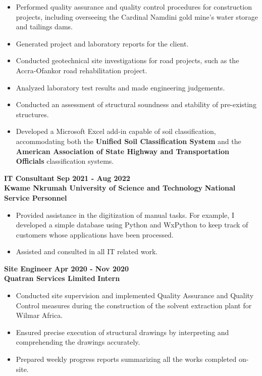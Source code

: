 \documentclass[letterpaper, 12pt]{article}
\newcommand{\verticalSpace}{4pt}
\begin{document}
\begin{itemize}[leftmargin=*]

	\item Performed quality assurance and quality control procedures for construction projects, including
	      overseeing the Cardinal Namdini gold mine's water storage and tailings dams.
	\item Generated project and laboratory reports for the client.
	\item Conducted geotechnical site investigations for road projects, such as the Accra-Ofankor
	      road rehabilitation project.
	\item Analyzed laboratory test results and made engineering judgements.
	\item Conducted an assessment of structural soundness and stability of pre-existing structures.
	\item Developed a Microsoft Excel add-in capable of soil classification, accommodating both the
	      \textbf{Unified Soil Classification System} and the
	      \textbf{American Association of State Highway and Transportation Officials} classification systems.

\end{itemize}

\textbf{IT Consultant} \hfill \textbf{Sep 2021 - Aug 2022} \\ [\verticalSpace]
\textbf{Kwame Nkrumah University of Science and Technology} \hfill \textbf{National Service Personnel}

\begin{itemize}[leftmargin=*]

	\item Provided assistance in the digitization of manual tasks. For example,
	      I developed a simple database using Python and WxPython to keep track of
	      customers whose applications have been processed.
	\item Assisted and consulted in all IT related work.

\end{itemize}

\textbf{Site Engineer} \hfill \textbf{Apr 2020 - Nov 2020} \\ [\verticalSpace]
\textbf{Quatran Services Limited} \hfill \textbf{Intern}

\begin{itemize}[leftmargin=*]

	\item Conducted site supervision and implemented Quality Assurance and Quality Control
	      measures during the construction of the solvent extraction plant for Wilmar Africa.
	\item Ensured precise execution of structural drawings by interpreting and comprehending
	      the drawings accurately.
	\item Prepared weekly progress reports summarizing all the works completed on-site.

\end{itemize}
\end{document}
